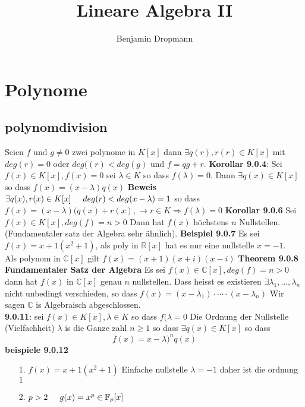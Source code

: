 \documentclass{article}
\title{Lineare Algebra II}
\author{Benjamin Dropmann}
\newcommand{\mspc}{\hspace{0.7cm}}
\begin{document}
\maketitle
\section{Polynome}
\subsection{polynomdivision}
Seien $f$ und $g\ne0$ zwei polynome in $K[x]$ dann $\exists q(r), r(r)\in K[x]$ mit $deg(r)=0$ oder $deg((r)<deg(g)$ und $f=qg+r$.\newline
\textbf{Korollar 9.0.4}: Sei $f(x)\in K[x],f(x)=0$ sei $\lambda\in K$ so dass $f(\lambda)=0$. Dann $\exists q(x)\in K[x]$ so dass $ f(x)=(x-\lambda)q(x)$\newline
\textbf{Beweis} $\exists q(x),r(x)\in K[x] \hspace{0.5cm}deg(r)<deg(x-\lambda)=1$ so dass $f(x)=(x-\lambda)(q(x)+r(x), \rightarrow r\in K\Rightarrow f(\lambda)=0$\newline
\textbf{Korollar 9.0.6} Sei $f(x)\in K[x], deg(f)=n>0$ Dann hat $f(x)$ höchstens $n$ Nullstellen. (Fundamentaler satz der Algebra sehr ähnlich).\newline
\textbf{Beispiel 9.0.7} Es sei $f(x)=x+1(x^2+1)$, als poly in $\mathbb{R}[x]$ hat es nur eine nullstelle $x=-1$.\\
Als polynom in $\mathbb{C}[x]$ gilt $f(x)=(x+1)(x+i)(x-i)$\newline
\textbf{Theorem 9.0.8 Fundamentaler Satz der Algebra} Es sei $f(x)\in \mathbb{C}[x], deg(f)=n>0$ dann hat $f(x)$ in $\mathbb{C}[x]$ genau $n$ nullstellen. Dass heisst es existieren $\exists \lambda_1,...,\lambda_n$ nicht unbedingt verschieden, so dass $f(x)=(x-\lambda_1)\cdot\left.\right.\cdots\left.\right.\cdot(x-\lambda_n)$ Wir sagen $\mathbb{C}$ is Algebraisch abgeschlossen.\\
\textbf{9.0.11}: sei $f(x)\in K[x], \lambda\in K$ so dass $f(\lambda=0$ Die Ordnung der Nullstelle (Vielfachheit) $\lambda$ is die Ganze zahl $n\ge1$ so dass $\exists q(x)\in K[x]$ so dass \[f(x)=x-\lambda)^nq(x)\]
\textbf{beispiele 9.0.12}\begin{itemize}
\item[1.]{$f(x)=x+1(x^2+1) $ Einfache nullstelle $\lambda=-1$ daher ist die ordnung $1$}
\item[2.]{$p>2\hspace{0.5cm}g(x)=x^p\in\mathbb{F}_p[x]\mspc$ }
\end{itemize}
\end{document}
